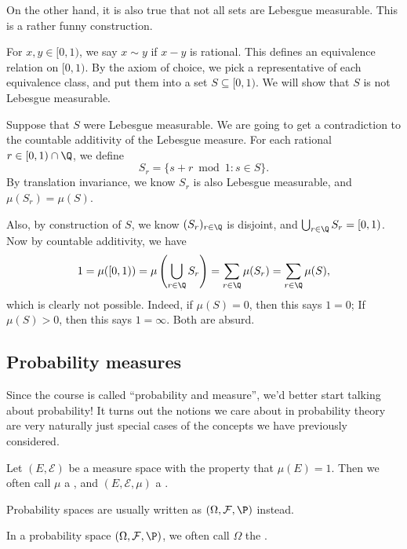\documentclass[a4paper]{article}
\begin{document}
On the other hand, it is also true that not all sets are Lebesgue measurable. This is a rather funny construction.

\begin{eg}
  For $x, y \in [0, 1)$, we say $x \sim y$ if $x - y$ is rational. This defines an equivalence relation on $[0, 1)$. By the axiom of choice, we pick a representative of each equivalence class, and put them into a set $S \subseteq [0, 1)$. We will show that $S$ is not Lebesgue measurable.

  Suppose that $S$ were Lebesgue measurable. We are going to get a contradiction to the countable additivity of the Lebesgue measure. For each rational $r \in [0, 1) \cap \Q$, we define
  \[
    S_r = \{s + r \bmod 1: s \in S\}.
  \]
  By translation invariance, we know $S_r$ is also Lebesgue measurable, and $\mu(S_r) = \mu(S)$.

  Also, by construction of $S$, we know $(S_r)_{r \in \Q}$ is disjoint, and $\bigcup_{r \in \Q} S_r = [0, 1)$. Now by countable additivity, we have
  \[
    1 = \mu([0, 1)) = \mu\left(\bigcup_{r \in \Q}S_r\right) = \sum_{r \in \Q}\mu(S_r) = \sum_{r \in \Q}\mu(S),
  \]
  which is clearly not possible. Indeed, if $\mu(S) = 0$, then this says $1 = 0$; If $\mu(S) > 0$, then this says $1 = \infty$. Both are absurd.
\end{eg}

\subsection{Probability measures}
Since the course is called ``probability and measure'', we'd better start talking about probability! It turns out the notions we care about in probability theory are very naturally just special cases of the concepts we have previously considered.

\begin{defi}
  Let $(E, \mathcal{E})$ be a measure space with the property that $\mu(E) = 1$. Then we often call $\mu$ a , and $(E, \mathcal{E}, \mu)$ a .
\end{defi}

Probability spaces are usually written as $(\Omega, \mathcal{F}, \P)$ instead.

\begin{defi}
  In a probability space $(\Omega, \mathcal{F}, \P)$, we often call $\Omega$ the .
\end{defi}
\end{document}
